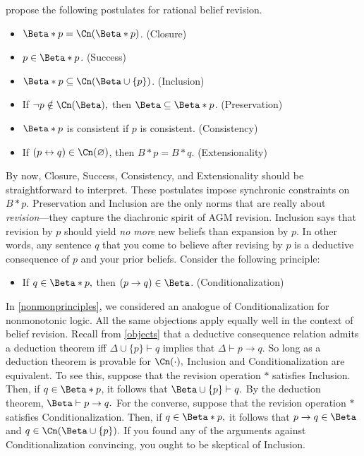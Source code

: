 \citet{alchourron1985logic} propose the following postulates for rational belief
revision.
\begin{itemize}
\item[] $\Beta*p = \Cn(\Beta*p)$. \hfill(Closure)
\item[] $p\in \Beta*p$. \hfill(Success)
\item[] $\Beta*p\subseteq \Cn(\Beta \cup \{p\})$. \hfill(Inclusion)
\item[] If $\neg p \notin \Cn(\Beta),$ then $\Beta\subseteq \Beta*p$.
\hfill(Preservation)
\item[] $\Beta*p$ is consistent if $p$ is consistent. \hfill(Consistency)
\item[] If $(p\leftrightarrow q) \in \Cn(\varnothing)$, then $B*p=B*q$.
\hfill(Extensionality)
\end{itemize}
By now, Closure, Success, Consistency, and Extensionality should be
straightforward to interpret. These postulates impose synchronic constraints on
$B*p$. Preservation and Inclusion are the only norms that are really about {\em
revision}---they capture the diachronic spirit of AGM revision. Inclusion says
that revision by $p$ should yield {\em no more} new beliefs than expansion by
$p$. In other words, any sentence $q$ that you come to believe after revising by
$p$ is a deductive consequence of $p$ and your prior beliefs.  Consider the
following principle:
\begin{itemize}
\item[] If $q\in \Beta*p,$ then $(p\rightarrow q) \in \Beta$.
\hfill(Conditionalization)
\end{itemize}
In \autoref{nonmonprinciples}, we considered an analogue of Conditionalization
for nonmonotonic logic. All the same objections apply equally well in the
context of belief revision. Recall from \autoref{objects} that a deductive
consequence relation admits a deduction theorem iff $\Delta \cup \{ p\} \vdash
q$ implies that $\Delta \vdash p\rightarrow q.$ So long as a deduction theorem
is provable for $\Cn(\cdot),$ Inclusion and Conditionalization are equivalent.
To see this, suppose that the revision operation $*$ satisfies Inclusion. Then,
if $q\in \Beta*p$, it follows that $\Beta\cup \{p\} \vdash q.$ By the deduction
theorem, $\Beta\vdash p\rightarrow q.$ For the converse, suppose that the
revision operation $*$ satisfies Conditionalization. Then, if $q\in \Beta*p,$ it
follows that $p\rightarrow q \in \Beta$ and $q \in \Cn(\Beta \cup \{p\}).$ If
you found any of the arguments against Conditionalization convincing, you ought
to be skeptical of Inclusion.


